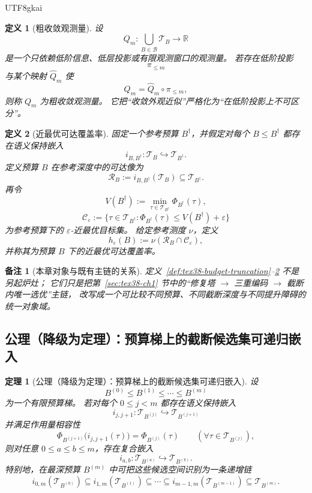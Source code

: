 \documentclass[12pt]{article}
\newtheorem{definition}{定义}[section]
\newtheorem{theorem}{定理}[section]
\newtheorem{remark}{备注}[section]
\newcommand{\RR}{\mathbb{R}}
\begin{document}
\begin{CJK*}{UTF8}{gkai}
\begin{definition}[粗收敛观测量]
\label{def:tex38-coarse-observable}
设
\[
  Q_m:\bigcup_{B\in\mathcal B}\mathcal T_B\to\RR
\]
是一个只依赖低阶信息、低层投影或有限观测窗口的观测量。
若存在低阶投影
\[
  \pi_{\le m}
\]
与某个映射 $\widehat Q_m$ 使
\[
  Q_m=\widehat Q_m\circ\pi_{\le m},
\]
则称 $Q_m$ 为\emph{粗收敛观测量}。
它把“收敛外观近似”严格化为“在低阶投影上不可区分”。
\end{definition}

\begin{definition}[近最优可达覆盖率]
\label{def:tex38-reachable-coverage}
固定一个参考预算 $B^\dagger$，并假定对每个 $B\le B^\dagger$ 都存在语义保持嵌入
\[
  i_{B,B^\dagger}:\mathcal T_B\hookrightarrow\mathcal T_{B^\dagger}.
\]
定义预算 $B$ 在参考深度中的\emph{可达像}为
\[
  \mathcal R_B:=i_{B,B^\dagger}(\mathcal T_B)\subseteq\mathcal T_{B^\dagger}.
\]
再令
\[
  V(B^\dagger):=
  \min_{\tau\in\mathcal T_{B^\dagger}}\Phi_{B^\dagger}(\tau),
\]
\[
  \mathcal C_\varepsilon
  :=
  \{\tau\in\mathcal T_{B^\dagger}:\Phi_{B^\dagger}(\tau)\le V(B^\dagger)+\varepsilon\}
\]
为参考预算下的 $\varepsilon$-近最优目标集。
给定参考测度 $\nu$，定义
\[
  h_\varepsilon(B)
  :=
  \nu(\mathcal R_B\cap\mathcal C_\varepsilon),
\]
并称其为预算 $B$ 下的\emph{近最优可达覆盖率}。
\end{definition}

\begin{remark}[本章对象与既有主链的关系]
定义~\ref{def:tex38-budget-truncation}--\ref{def:tex38-reachable-coverage} 不是另起炉灶；
它们只是把第~\ref{sec:tex38-ch1} 节中的“修复塔 $\to$ 三重编码 $\to$ 截断内唯一选优”主链，
改写成一个可比较不同预算、不同截断深度与不同提升障碍的统一对象域。
\end{remark}

\subsection{公理（降级为定理）：预算梯上的截断候选集可递归嵌入}
\label{subsec:tex38-budget-embedding}

\begin{theorem}[公理（降级为定理）：预算梯上的截断候选集可递归嵌入]
\label{thm:tex38-budget-embedding}
设
\[
  B^{(0)}\le B^{(1)}\le\cdots\le B^{(m)}
\]
为一个有限预算梯。
若对每个 $0\le j<m$ 都存在语义保持嵌入
\[
  i_{j,j+1}:\mathcal T_{B^{(j)}}\hookrightarrow\mathcal T_{B^{(j+1)}}
\]
并满足作用量相容性
\[
  \Phi_{B^{(j+1)}}\bigl(i_{j,j+1}(\tau)\bigr)=\Phi_{B^{(j)}}(\tau)
  \qquad
  (\forall \tau\in\mathcal T_{B^{(j)}}),
\]
则对任意 $0\le a\le b\le m$，存在复合嵌入
\[
  i_{a,b}:\mathcal T_{B^{(a)}}\hookrightarrow\mathcal T_{B^{(b)}}.
\]
特别地，在最深预算 $B^{(m)}$ 中可把这些候选空间识别为一条递增链
\[
  i_{0,m}(\mathcal T_{B^{(0)}})
  \subseteq
  i_{1,m}(\mathcal T_{B^{(1)}})
  \subseteq
  \cdots
  \subseteq
  i_{m-1,m}(\mathcal T_{B^{(m-1)}})
  \subseteq
  \mathcal T_{B^{(m)}}.
\]
\end{theorem}


\end{CJK*}
\end{document}
